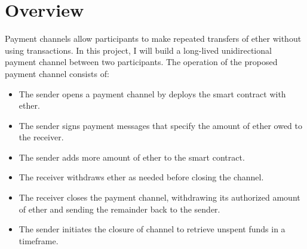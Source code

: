 \section{Overview}\label{sec:overview}
Payment channels allow participants to make repeated transfers of ether without using transactions.
In this project, I will build a long-lived unidirectional payment channel between two participants.
The operation of the proposed payment channel consists of:
\begin{itemize}
    \item The sender opens a payment channel by deploys the smart contract with ether.
    \item The sender signs payment messages that specify the amount of ether owed to the receiver.
    \item The sender adds more amount of ether to the smart contract.
    \item The receiver withdraws ether as needed before closing the channel.
    \item The receiver closes the payment channel, withdrawing its authorized amount of ether and sending the remainder
    back to the sender.
    \item The sender initiates the closure of channel to retrieve unspent funds in a timeframe.
\end{itemize}